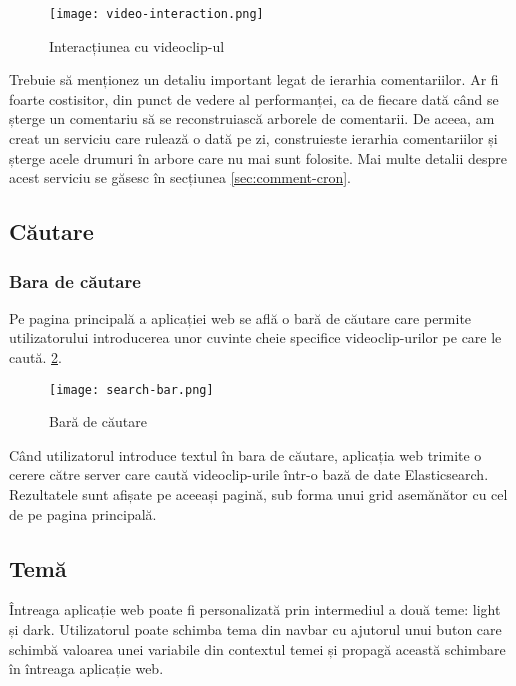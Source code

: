 \begin{figure}[h]
    \centering
    \texttt{[image: video-interaction.png]}
    \caption{Interacțiunea cu videoclip-ul}
    \label{fig:video-interaction}

\end{figure}

\par

Trebuie să menționez un detaliu important legat de ierarhia comentariilor. Ar fi foarte costisitor,
din punct de vedere al performanței, ca de fiecare dată când se șterge un comentariu să se reconstruiască
arborele de comentarii. De aceea, am creat un serviciu care rulează o dată pe zi, construieste ierarhia
comentariilor și șterge acele drumuri în arbore care nu mai sunt folosite. Mai multe detalii despre
acest serviciu se găsesc în secțiunea \ref{sec:comment-cron}.

\subsection{Căutare}
\subsubsection{Bara de căutare}
Pe pagina principală a aplicației web se află o bară de căutare care permite utilizatorului
introducerea unor cuvinte cheie specifice videoclip-urilor pe care le caută.
\ref {fig:search-bar}.

\vspace{1em}
\begin{figure}[h]
    \centering
    \texttt{[image: search-bar.png]}
    \caption{Bară de căutare}
    \label{fig:search-bar}
\end{figure}

\par
Când utilizatorul introduce textul în bara de căutare, aplicația web trimite o cerere 
către server care caută videoclip-urile într-o bază de date Elasticsearch. Rezultatele
sunt afișate pe aceeași pagină, sub forma unui grid asemănător cu cel de pe pagina principală.

\subsection{Temă}
Întreaga aplicație web poate fi personalizată prin intermediul a două teme: light și dark.
Utilizatorul poate schimba tema din navbar cu ajutorul unui buton care schimbă valoarea
unei variabile din contextul temei și propagă această schimbare în întreaga aplicație web.


